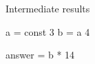 





Intermediate results

\begin{mycode}
a = const 3
b = a 4
\end{mycode}


\begin{mycode}
answer = b * 14
\end{mycode}




